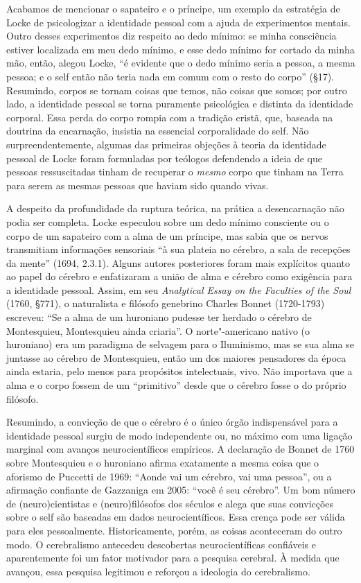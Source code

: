 Acabamos de mencionar o sapateiro e o príncipe, um exemplo da estratégia
de Locke de psicologizar a identidade pessoal com a ajuda de
experimentos mentais. Outro desses experimentos diz respeito ao dedo
mínimo: se minha consciência estiver localizada em meu dedo mínimo, e
esse dedo mínimo for cortado da minha mão, então, alegou Locke, ``é
evidente que o dedo mínimo seria a pessoa, a mesma pessoa; e o self
então não teria nada em comum com o resto do corpo'' (§17). Resumindo,
corpos se tornam coisas que temos, não coisas que somos; por outro lado,
a identidade pessoal se torna puramente psicológica e distinta da
identidade corporal. Essa perda do corpo rompia com a tradição cristã,
que, baseada na doutrina da encarnação, insistia na essencial
corporalidade do self. Não surpreendentemente, algumas das primeiras
objeções à teoria da identidade pessoal de Locke foram formuladas por
teólogos defendendo a ideia de que pessoas ressuscitadas tinham de
recuperar o \emph{mesmo} corpo que tinham na Terra para serem as mesmas
pessoas que haviam sido quando vivas.

A despeito da profundidade da ruptura teórica, na prática a
desencarnação não podia ser completa. Locke especulou sobre um dedo
mínimo consciente ou o corpo de um sapateiro com a alma de um príncipe,
mas sabia que os nervos transmitiam informações sensoriais ``à sua
plateia no cérebro, a sala de recepções da mente'' (1694, 2.3.1). Alguns
autores posteriores foram mais explícitos quanto ao papel do cérebro e
enfatizaram a união de alma e cérebro como exigência para a identidade
pessoal. Assim, em seu \emph{Analytical Essay on the Faculties of the
Soul} (1760, §771), o naturalista e filósofo genebrino Charles Bonnet
(1720-1793) escreveu: ``Se a alma de um huroniano pudesse ter herdado o
cérebro de Montesquieu, Montesquieu ainda criaria''. O norte"-americano
nativo (o huroniano) era um paradigma de selvagem para o Iluminismo, mas
se sua alma se juntasse ao cérebro de Montesquieu, então um dos maiores
pensadores da época ainda estaria, pelo menos para propósitos
intelectuais, vivo. Não importava que a alma e o corpo fossem de um
``primitivo'' desde que o cérebro fosse o do próprio filósofo.

Resumindo, a convicção de que o cérebro é o único órgão indispensável
para a identidade pessoal surgiu de modo independente ou, no máximo com
uma ligação marginal com avanços neurocientíficos empíricos. A
declaração de Bonnet de 1760 sobre Montesquieu e o huroniano afirma
exatamente a mesma coisa que o aforismo de Puccetti de 1969: ``Aonde vai
um cérebro, vai uma pessoa'', ou a afirmação confiante de Gazzaniga em
2005: ``você é seu cérebro''. Um bom número de (neuro)cientistas e
(neuro)filósofos dos séculos  e  alega que suas convicções sobre o
self são baseadas em dados neurocientíficos. Essa crença pode ser válida
para eles pessoalmente. Historicamente, porém, as coisas aconteceram do
outro modo. O cerebralismo antecedeu descobertas neurocientíficas
confiáveis e aparentemente foi um fator motivador para a pesquisa
cerebral. À medida que avançou, essa pesquisa legitimou e reforçou a
ideologia do cerebralismo.


